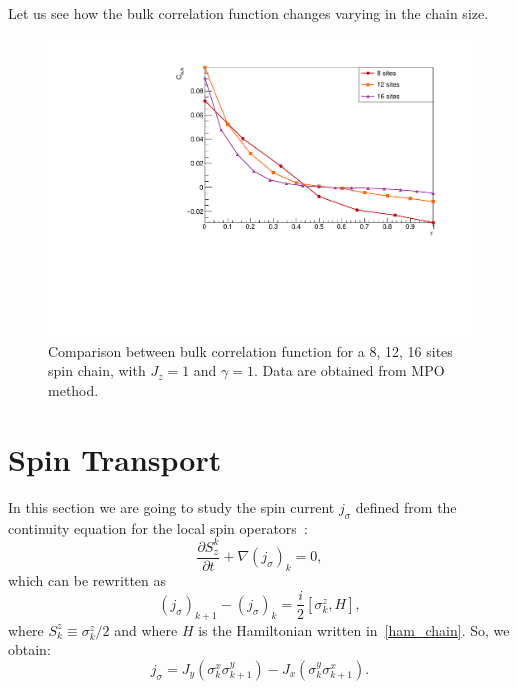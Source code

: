 Let us see how the bulk correlation function changes varying in the chain size.

\begin{figure}[H]
    \centering
    \includegraphics[scale=0.7]{Figures/CBulkwConnTermVSsize_J1051.pdf}
    \caption{Comparison between bulk correlation function for a 8, 12, 16 sites spin chain, with $J_z = 1$ and $\gamma = 1$. Data are obtained from MPO method.}
    \label{fig:CBulkwConnTermVSsize_J1051}
\end{figure}

\section{Spin Transport}
In this section we are going to study the spin current $j_\sigma$ defined from the continuity equation for the local spin operators~\cite{BenentiCasatiProsenRossini}:
\begin{equation}
    \frac{\partial S^k_z}{\partial t} + \nabla (j_\sigma)_k = 0,
\end{equation}
which can be rewritten as
\begin{equation}
    (j_\sigma)_{k+1}-(j_\sigma)_k = \frac{i}{2}[\sigma_k^z , H],
\end{equation}
where $S_k^z \equiv \sigma_k^z/2$ and where $H$ is the Hamiltonian written in~\ref{ham_chain}. So, we obtain:
\begin{equation}
    j_\sigma = J_y (\sigma_k^x \sigma_{k+1}^y) - J_x (\sigma_k^y \sigma_{k+1}^x). 
\end{equation}


